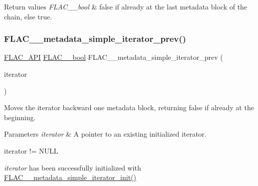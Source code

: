 \begin{DoxyRetVals}{Return values}
{\em F\+L\+A\+C\+\_\+\+\_\+bool} & {\ttfamily false} if already at the last metadata block of the chain, else {\ttfamily true}. \\
\hline
\end{DoxyRetVals}
\mbox{\label{group__flac__metadata__level1_ga49f495dec0f44116d66e1b79356a1160}} 
\subsubsection{\texorpdfstring{F\+L\+A\+C\+\_\+\+\_\+metadata\+\_\+simple\+\_\+iterator\+\_\+prev()}{FLAC\_\_metadata\_simple\_iterator\_prev()}}
{\footnotesize\ttfamily \hyperlink{group__flac__export_ga56ca07df8a23310707732b1c0007d6f5}{F\+L\+A\+C\+\_\+\+A\+PI} \hyperlink{ordinals_8h_a95103469f1cbd78b8cf250194985b34e}{F\+L\+A\+C\+\_\+\+\_\+bool} F\+L\+A\+C\+\_\+\+\_\+metadata\+\_\+simple\+\_\+iterator\+\_\+prev (\begin{DoxyParamCaption}\item[{\hyperlink{group__flac__metadata__level1_ga6accccddbb867dfc2eece9ee3ffecb3a}{F\+L\+A\+C\+\_\+\+\_\+\+Metadata\+\_\+\+Simple\+Iterator} $\ast$}]{iterator }\end{DoxyParamCaption})}

Moves the iterator backward one metadata block, returning {\ttfamily false} if already at the beginning.


\begin{DoxyParams}{Parameters}
{\em iterator} & A pointer to an existing initialized iterator.  
\begin{DoxyCode}
iterator != NULL 
\end{DoxyCode}
 {\itshape iterator} has been successfully initialized with \hyperlink{group__flac__metadata__level1_ga2a055cca4e6e06ae62517c8b0fa6e8a3}{F\+L\+A\+C\+\_\+\+\_\+metadata\+\_\+simple\+\_\+iterator\+\_\+init()} \\
\hline
\end{DoxyParams}

